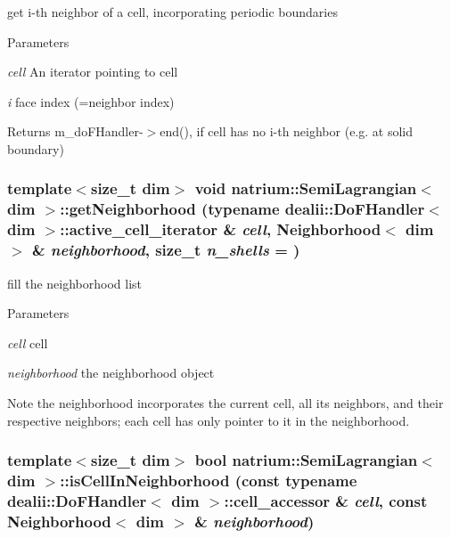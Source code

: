 get i-\/th neighbor of a cell, incorporating periodic boundaries 
\begin{DoxyParams}{Parameters}
\item[{\em cell}]An iterator pointing to cell \item[{\em i}]face index (=neighbor index) \end{DoxyParams}
\begin{DoxyReturn}{Returns}
m\_\-doFHandler-\/$>$end(), if cell has no i-\/th neighbor (e.g. at solid boundary) 
\end{DoxyReturn}
\hypertarget{classnatrium_1_1SemiLagrangian_a511a39fcd3f598bd42c18deeb50cd7f5}{
\subsubsection[{getNeighborhood}]{\setlength{\rightskip}{0pt plus 5cm}template$<$size\_\-t dim$>$ void {\bf natrium::SemiLagrangian}$<$ dim $>$::getNeighborhood (typename dealii::DoFHandler$<$ dim $>$::active\_\-cell\_\-iterator \& {\em cell}, \/  Neighborhood$<$ dim $>$ \& {\em neighborhood}, \/  size\_\-t {\em n\_\-shells} = {})}}
\label{classnatrium_1_1SemiLagrangian_a511a39fcd3f598bd42c18deeb50cd7f5}


fill the neighborhood list 
\begin{DoxyParams}{Parameters}
\item[{\em cell}]cell \item[{\em neighborhood}]the neighborhood object \end{DoxyParams}
\begin{DoxyNote}{Note}
the neighborhood incorporates the current cell, all its neighbors, and their respective neighbors; each cell has only pointer to it in the neighborhood. 
\end{DoxyNote}
\hypertarget{classnatrium_1_1SemiLagrangian_a7facbe9874541441921973030ec6f831}{
\subsubsection[{isCellInNeighborhood}]{\setlength{\rightskip}{0pt plus 5cm}template$<$size\_\-t dim$>$ bool {\bf natrium::SemiLagrangian}$<$ dim $>$::isCellInNeighborhood (const typename dealii::DoFHandler$<$ dim $>$::cell\_\-accessor \& {\em cell}, \/  const Neighborhood$<$ dim $>$ \& {\em neighborhood})}}
\label{classnatrium_1_1SemiLagrangian_a7facbe9874541441921973030ec6f831}


